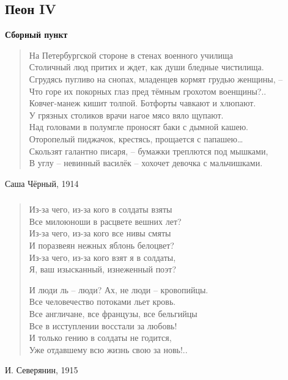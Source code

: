 \documentclass{beamer}
\begin{document}
\subsection{Пеон IV}\label{sec:sum4}


\begin{frame}
\begin{center}
\textbf{Сборный пункт}
\end{center}

\begin{verse}
На Петербургской стороне в стенах военного училища\\
Столичный люд притих и ждет, как души бледные чистилища. \\
Сгрудясь пугливо на снопах, младенцев кормят грудью женщины, –\\
Что горе их покорных глаз пред тёмным грохотом военщины?.. \\
Ковчег-манеж кишит толпой. Ботфорты чавкают и хлюпают. \\
У грязных столиков врачи нагое мясо вяло щупают. \\
Над головами в полумгле проносят баки с дымной кашею. \\
Оторопелый пиджачок, крестясь, прощается с папашею… \\
Скользят галантно писаря, – бумажки треплются под мышками, \\
В углу – невинный василёк – хохочет девочка с мальчишками. \\

\end{verse}
Саша Чёрный, 1914
\end{frame}


\begin{frame}
\frametitle{}

\begin{verse}

Из-за чего, из-за кого в солдаты взяты\\
Все милоюноши в расцвете вешних лет?\\
Из-за чего, из-за кого все нивы смяты\\
И поразвеян нежных яблонь белоцвет?\\
Из-за чего, из-за кого взят я в солдаты,\\
Я, ваш изысканный, изнеженный поэт?

И люди ль – люди? Ах, не люди – кровопийцы.\\
Все человечество потоками льет кровь.\\
Все англичане, все французы, все бельгийцы\\
Все в исступлении восстали за любовь!\\
И только гению в солдаты не годится,\\
Уже отдавшему всю жизнь свою за новь!..
\end{verse}

И. Северянин, 1915
\end{frame}
\end{document}
